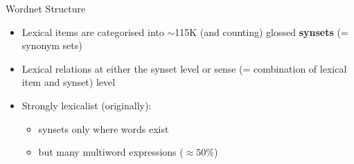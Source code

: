 \begin{frame}{Wordnet Structure}
\begin{itemize}
\item Lexical items are categorised into $\sim$115K (and counting) glossed \textbf{synsets} (= synonym sets)

\item Lexical relations at either the synset level or sense (=
  combination of lexical item and synset) level 
\item Strongly lexicalist (originally):
  \begin{itemize}
  \item synsets only where words exist
  \item but many multiword expressions ($\approx 50\%$)
  \end{itemize}


\end{itemize}

\end{frame}

